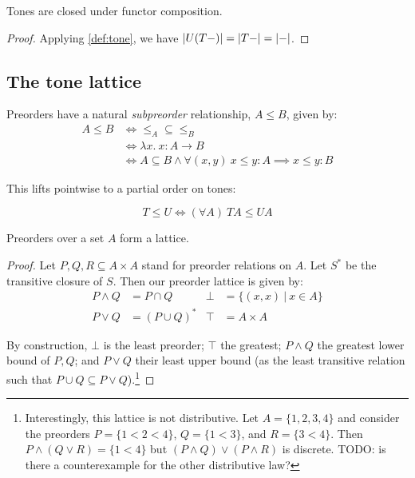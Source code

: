 \documentclass{rntz}
\newcommand{\todo}[1]{{\color{Purple}#1}}
\newcommand{\x}{\times}
\newcommand{\fn}{\lambda}
\newcommand{\binder}{.~}
\newcommand{\bind}[1]{{#1}\binder}
\newcommand{\fnof}[1]{\fn\bind{#1}}
\newcommand{\subtype}{\le}
\newcommand{\cat}[1]{\textsc{#1}} %
\newcommand{\Cat}{\cat{cat}}
\begin{document}




\begin{theorem}
  Tones are closed under functor composition.
\end{theorem}

\begin{proof} Applying \cref{def:tone}, we have
  \( |{U(T-)}| = |{T-}| = |{-}| \).
\end{proof}


\subsection{The tone lattice}

Preorders have a natural \emph{subpreorder} relationship, $A \subtype B$, given
by:
\begin{align*}
  A \subtype B
  &\iff {\le_A} \subseteq {\le_B}
  \\ &\iff \fnof{x} x : A \to B
  \\ &\iff A \subseteq B \wedge \forall(x,y)~ x \le y : A \implies x \le y : B
\end{align*}

\noindent This lifts pointwise to a partial order on tones:

\[ T \le U \iff (\forall A)~ TA \subtype UA \]

\newcommand{\setfor}[2]{\{#1 ~|~ #2\}}

\begin{theorem}\label{thm:subpreorder-lattice}
  Preorders over a set $A$ form a lattice.
\end{theorem}

\begin{proof}
  Let $P,Q,R \subseteq A \x A$ stand for preorder relations on $A$. Let $S^*$ be
  the transitive closure of $S$. Then our preorder lattice is given by:
  \begin{align*}
    P \wedge Q &= P \cap Q  & \bot &= \setfor{(x,x)}{x \in A} \\
    P \vee Q &= (P \cup Q)^* & \top &= A \x A
  \end{align*}

  By construction, $\bot$ is the least preorder; $\top$ the greatest; $P \wedge
  Q$ the greatest lower bound of $P, Q$; and $P \vee Q$ their least upper bound
  (as the least transitive relation such that $P \cup Q \subseteq P \vee
  Q$).\footnote{Interestingly, this lattice is not distributive. Let $A =
    \{1,2,3,4\}$ and consider the preorders $P = \{1 < 2 < 4\}$, $Q = \{1 <
    3\}$, and $R = \{3 < 4\}$. Then $P \wedge (Q \vee R) = \{1 < 4\}$ but $(P
    \wedge Q) \vee (P \wedge R)$ is discrete. \todo{TODO: is there a
      counterexample for the other distributive law?}}
\end{proof}
\end{document}
